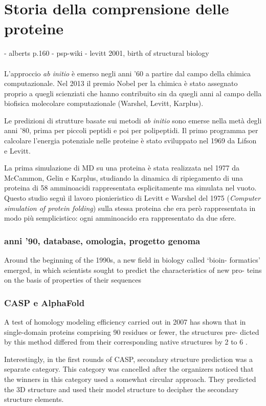 \section{Storia della comprensione delle proteine}
- alberts p.160
- psp-wiki
- levitt 2001, birth of structural biology \\ \\


L'approccio \textit{ab initio} è emerso negli anni '60 a partire dal campo della chimica computazionale. Nel 2013 il premio Nobel per la chimica è stato assegnato proprio a quegli scienziati che hanno contribuito sin da quegli anni al campo della biofisica molecolare computazionale (Warshel, Levitt, Karplus).

\par Le predizioni di strutture basate sui metodi \textit{ab initio} sono emerse nella metà degli anni '80, prima per piccoli peptidi e poi per polipeptidi. Il primo programma per calcolare l'energia potenziale nelle proteine è stato sviluppato nel 1969 da Lifson e Levitt\supercite{levitt1969refinement}.

\par La prima simulazione di MD su una proteina è stata realizzata nel 1977 da McCammon, Gelin e Karplus\supercite{mccammon1977dynamics}, studiando la dinamica di ripiegamento di una proteina di 58 amminoacidi rappresentata esplicitamente ma simulata nel vuoto. Questo studio seguì il lavoro pionieristico di Levitt e Warshel del 1975 (\textit{Computer simulation of protein folding}\supercite{levitt1975computer}) sulla stessa proteina che era però rappresentata in modo più semplicistico: ogni amminoacido era rappresentato da due sfere. 

\subsubsection{anni '90, database, omologia, progetto genoma}

Around the beginning of the 1990s, a new field in biology called ‘bioin-
formatics’ emerged, in which scientists sought to predict the characteristics of new pro-
teins on the basis of properties of their sequences

\subsubsection{CASP e AlphaFold}

A test of homology modeling efficiency carried out in 2007 has
shown that in single-domain proteins comprising 90 residues or fewer, the structures pre-
dicted by this method differed from their corresponding native structures by 2 to 6 \supercite{dill2008protein}.



Interestingly, in the first rounds of CASP, secondary structure prediction was a separate category. This
category was cancelled after the organizers noticed that the winners in this category used a somewhat circular
approach. They predicted the 3D structure and used their model structure to decipher the secondary structure
elements.

\clearpage